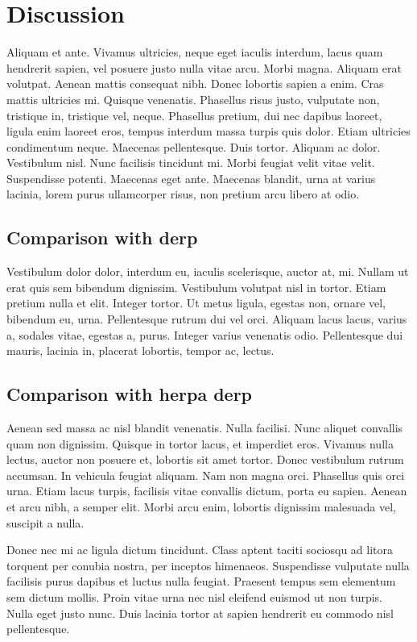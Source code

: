 \chapter{Discussion}
Aliquam et ante. Vivamus ultricies, neque eget iaculis interdum, lacus
quam hendrerit sapien, vel posuere justo nulla vitae arcu. Morbi
magna. Aliquam erat volutpat. Aenean mattis consequat nibh. Donec
lobortis sapien a enim. Cras mattis ultricies mi. Quisque venenatis.
Phasellus risus justo, vulputate non, tristique in, tristique vel,
neque. Phasellus pretium, dui nec dapibus laoreet, ligula enim laoreet
eros, tempus interdum massa turpis quis dolor. Etiam ultricies
condimentum neque. Maecenas pellentesque. Duis tortor. Aliquam ac
dolor. Vestibulum nisl. Nunc facilisis tincidunt mi. Morbi feugiat
velit vitae velit. Suspendisse potenti. Maecenas eget ante. Maecenas
blandit, urna at varius lacinia, lorem purus ullamcorper risus, non
pretium arcu libero at odio.

\section{Comparison with derp}
Vestibulum dolor dolor, interdum eu, iaculis scelerisque, auctor at,
mi. Nullam ut erat quis sem bibendum dignissim. Vestibulum volutpat
nisl in tortor. Etiam pretium nulla et elit. Integer tortor. Ut metus
ligula, egestas non, ornare vel, bibendum eu, urna. Pellentesque
rutrum dui vel orci. Aliquam lacus lacus, varius a, sodales vitae,
egestas a, purus. Integer varius venenatis odio. Pellentesque dui
mauris, lacinia in, placerat lobortis, tempor ac, lectus.

\section{Comparison with herpa derp}
Aenean sed massa ac nisl blandit venenatis. Nulla facilisi. Nunc aliquet convallis quam non dignissim. Quisque in tortor lacus, et imperdiet eros. Vivamus nulla lectus, auctor non posuere et, lobortis sit amet tortor. Donec vestibulum rutrum accumsan. In vehicula feugiat aliquam. Nam non magna orci. Phasellus quis orci urna. Etiam lacus turpis, facilisis vitae convallis dictum, porta eu sapien. Aenean et arcu nibh, a semper elit. Morbi arcu enim, lobortis dignissim malesuada vel, suscipit a nulla.

Donec nec mi ac ligula dictum tincidunt. Class aptent taciti sociosqu ad litora torquent per conubia nostra, per inceptos himenaeos. Suspendisse vulputate nulla facilisis purus dapibus et luctus nulla feugiat. Praesent tempus sem elementum sem dictum mollis. Proin vitae urna nec nisl eleifend euismod ut non turpis. Nulla eget justo nunc. Duis lacinia tortor at sapien hendrerit eu commodo nisl pellentesque.

